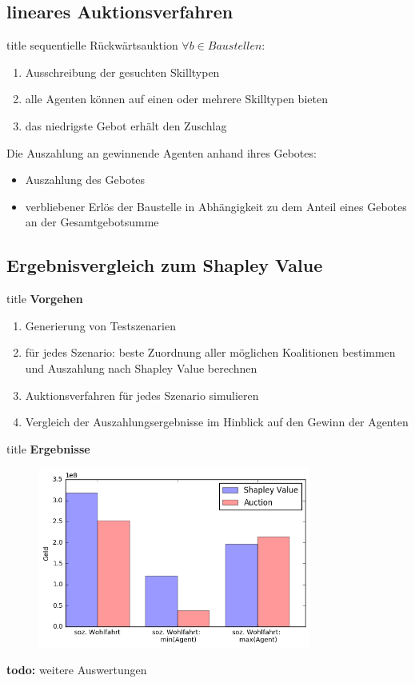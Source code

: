 \documentclass[c]{beamer}
\newcommand\todo[1]{\colorbox{blue!15}{\textbf{todo: }#1}\newline}
\theoremstyle{break}
\begin{document}
  \subsection*{lineares Auktionsverfahren}
  \begin{frame}{title}
    sequentielle Rückwärtsauktion $\forall{b \in Baustellen}$:
    \begin{enumerate}
      \item Ausschreibung der gesuchten Skilltypen
      \item alle Agenten können auf einen oder mehrere Skilltypen bieten
      \item das niedrigste Gebot erhält den Zuschlag \\[2em]
    \end{enumerate}
    
    Die Auszahlung an gewinnende Agenten anhand ihres Gebotes:
    \begin{itemize}
      \item Auszahlung des Gebotes
      \item verbliebener Erlös der Baustelle in Abhängigkeit zu dem Anteil eines Gebotes an der Gesamtgebotsumme
    \end{itemize}
  \end{frame}
  
  \subsection*{Ergebnisvergleich zum Shapley Value}
  \begin{frame}{title}
    \textbf{Vorgehen}
    \begin{enumerate}
      \item Generierung von Testszenarien
      \item für jedes Szenario: beste Zuordnung aller möglichen Koalitionen bestimmen und Auszahlung nach Shapley Value berechnen
      \item Auktionsverfahren für jedes Szenario simulieren
      \item Vergleich der Auszahlungsergebnisse im Hinblick auf den Gewinn der Agenten
    \end{enumerate}
  \end{frame}
  
  \begin{frame}{title}
    \textbf{Ergebnisse}
    \begin{figure}
      \centering
      \includegraphics[width=0.8\textwidth]{results.png}
    \end{figure}
    \todo{weitere Auswertungen}
  \end{frame}
\end{document}
